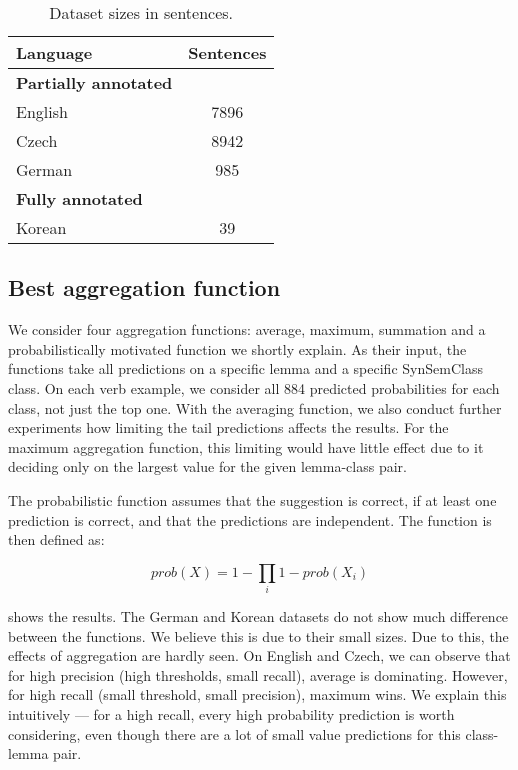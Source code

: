 \begin{table}
\centering
\begin{tabular}{lc} 
Language & Sentences \\
\hline
\textbf{Partially annotated} \\
English & 7896 \\ 
Czech & 8942 \\ 
German & 985 \\ 
\hline
\textbf{Fully annotated} \\
Korean & 39 \\ 
\end{tabular}
\caption{Dataset sizes in sentences.}
\label{table:dataset_size}
\end{table}

\subsection{Best aggregation function}

We consider four aggregation functions: average, maximum, summation and a probabilistically motivated function we shortly explain. As their input, the functions take all predictions on a specific lemma and a specific SynSemClass class. On each verb example, we consider all 884 predicted probabilities for each class, not just the top one. With the averaging function, we also conduct further experiments how limiting the tail predictions affects the results. For the maximum aggregation function, this limiting would have little effect due to it deciding only on the largest value for the given lemma-class pair.

The probabilistic function assumes that the suggestion is correct, if at least one prediction is correct, and that the predictions are independent. The function is then defined as:

$$
prob(X) = 1 - \prod_i 1 - prob(X_i)
$$

 shows the results. The German and Korean datasets do not show much difference between the functions. We believe this is due to their small sizes. Due to this, the effects of aggregation are hardly seen. On English and Czech, we can observe that for high precision (high thresholds, small recall), average is dominating. However, for high recall (small threshold, small precision), maximum wins. We explain this intuitively --- for a high recall, every high probability prediction is worth considering, even though there are a lot of small value predictions for this class-lemma pair.

